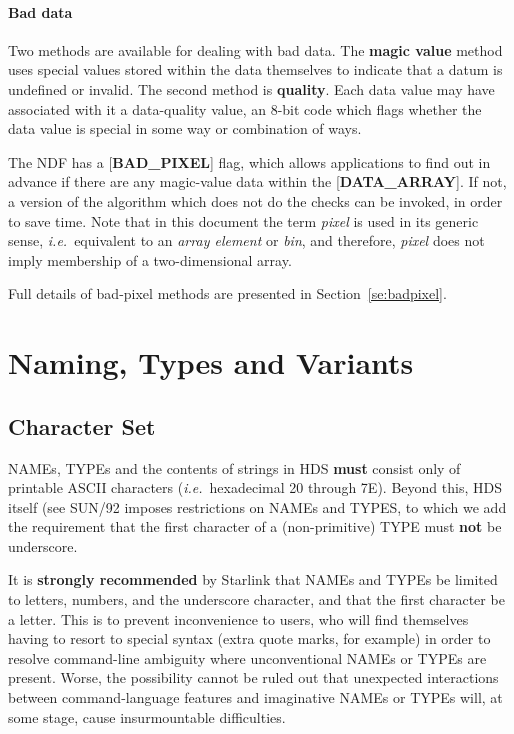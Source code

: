 \documentclass[twoside,11pt]{article}
\newcommand{\htmlref}[2]{#1}
\newcommand{\html}[1]{}
\newcommand{\latex}[1]{#1}
\newcommand{\xref}[3]{#1}
\newcommand{\xlabel}[1]{}
\begin{document}
\paragraph{Bad data}
Two methods are available for dealing with bad data.  The
{\bf magic value} method uses special values
stored within the data themselves to
indicate that a datum is undefined or invalid.  The second method is
{\bf quality}.  Each data value may have associated with
it a data-quality value, an 8-bit
code which flags whether the data value is special
in some way or combination of ways.

The NDF has a {[}{\bf BAD\_PIXEL}{]} flag, which allows applications
to find out in advance if there are any
magic-value data within the {[}{\bf DATA\_ARRAY}{]}.  If not, a
version of the algorithm which does not do the checks can be
invoked, in order to save time.  Note that in this document the term
{\em pixel} is used in its generic sense, {\it i.e.}\ equivalent to
an {\em array element} or {\em bin}, and therefore, {\em pixel}
does not imply membership of a two-dimensional array.

Full details of bad-pixel methods are presented \latex{in 
Section~\ref{se:badpixel}.}\html{\htmlref{here.}{se:badpixel}}

\section{\xlabel{se_natyvar}Naming, Types and
Variants\label{se:natyvar}}

\subsection{\xlabel{se_charset}Character Set\label{se:charset}}

NAMEs, TYPEs and the contents of strings in HDS
{\bf must} consist only of
printable ASCII characters ({\it i.e.}\ hexadecimal
20 through 7E).  Beyond this, HDS itself
(see \xref{SUN/92}{sun92}) imposes restrictions on NAMEs and TYPES,
to which we add the
requirement that the first character of a
(non-primitive) TYPE must {\bf not} be
underscore.

It is {\bf strongly recommended} by Starlink that NAMEs and TYPEs
be limited to letters, numbers, and the underscore character, and
that the first character be a letter.  This is to
prevent inconvenience
to users, who will find themselves having to resort
to special syntax (extra quote marks, for example) in order to
resolve
command-line ambiguity where unconventional NAMEs or TYPEs are
present.  Worse, the possibility cannot be ruled out that
unexpected interactions
between command-language features and imaginative NAMEs or TYPEs
will, at some stage, cause insurmountable difficulties.
\end{document}
